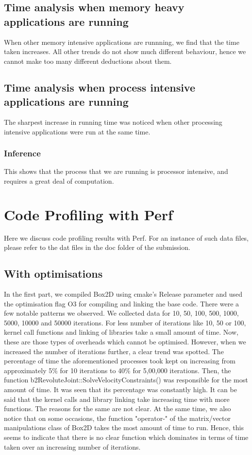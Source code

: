 \documentclass[a4paper,11pt]{article}
\begin{document}
	\subsection{Time analysis when memory heavy applications are running}
	When other memory intensive applications are runnning, we find that the time taken increases. All other trends do not show much different behaviour, hence we cannot make too many different deductions about them.
	\subsection{Time analysis when process intensive applications are running}
	The sharpest increase in running time was noticed when other processing intensive applications were run at the same time. 
	\subsubsection{Inference}
	This shows that the process that we are running is processor intensive, and requires a great deal of computation.
\pagebreak
	\section{Code Profiling with Perf}

	Here we discuss code profiling results with Perf. For an instance of such data files, please refer to the dat files in the doc folder of the submission.

	\subsection{With optimisations}

	In the first part, we compiled Box2D using cmake's Release parameter and used the optimisation flag O3 for compiling and linking the base code. There were a few notable patterns we observed. We collected data for 10, 50, 100, 500, 1000, 5000, 10000 and 50000 iterations. For less number of iterations like 10, 50 or 100, kernel call functions and linking of libraries take a small amount of time. Now, these are those types of overheads which cannot be optimised. However, when we increased the number of iterations further, a clear trend was spotted. The percentage of time the aforementioned processes took kept on increasing from approximately 5\% for 10 iterations to 40\% for 5,00,000 iterations. Then, the function b2RevoluteJoint::SolveVelocityConstraints() was responsible for the most amount of time. It was seen that its percentage was constantly high. It can be said that the kernel calls and library linking take increasing time with more functions. The reasons for the same are not clear. At the same time, we also notice that on some occasions, the function "operator-" of the matrix/vector manipulations class of Box2D takes the most amount of time to run. Hence, this seems to indicate that there is no clear function which dominates in terms of time taken over an increasing number of iterations.
\end{document}
